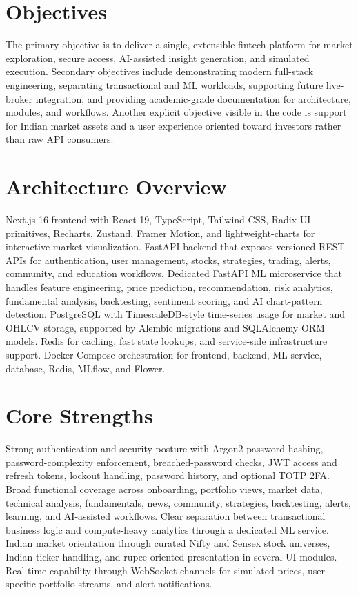 \documentclass[11pt,a4paper]{article}
\begin{document}
\section{Objectives}
The primary objective is to deliver a single, extensible fintech platform for market exploration, secure access, AI-assisted insight generation, and simulated execution. Secondary objectives include demonstrating modern full-stack engineering, separating transactional and ML workloads, supporting future live-broker integration, and providing academic-grade documentation for architecture, modules, and workflows. Another explicit objective visible in the code is support for Indian market assets and a user experience oriented toward investors rather than raw API consumers.
\section{Architecture Overview}
Next.js 16 frontend with React 19, TypeScript, Tailwind CSS, Radix UI primitives, Recharts, Zustand, Framer Motion, and lightweight-charts for interactive market visualization. FastAPI backend that exposes versioned REST APIs for authentication, user management, stocks, strategies, trading, alerts, community, and education workflows. Dedicated FastAPI ML microservice that handles feature engineering, price prediction, recommendation, risk analytics, fundamental analysis, backtesting, sentiment scoring, and AI chart-pattern detection. PostgreSQL with TimescaleDB-style time-series usage for market and OHLCV storage, supported by Alembic migrations and SQLAlchemy ORM models. Redis for caching, fast state lookups, and service-side infrastructure support. Docker Compose orchestration for frontend, backend, ML service, database, Redis, MLflow, and Flower.
\section{Core Strengths}
Strong authentication and security posture with Argon2 password hashing, password-complexity enforcement, breached-password checks, JWT access and refresh tokens, lockout handling, password history, and optional TOTP 2FA. Broad functional coverage across onboarding, portfolio views, market data, technical analysis, fundamentals, news, community, strategies, backtesting, alerts, learning, and AI-assisted workflows. Clear separation between transactional business logic and compute-heavy analytics through a dedicated ML service. Indian market orientation through curated Nifty and Sensex stock universes, Indian ticker handling, and rupee-oriented presentation in several UI modules. Real-time capability through WebSocket channels for simulated prices, user-specific portfolio streams, and alert notifications.
\end{document}

